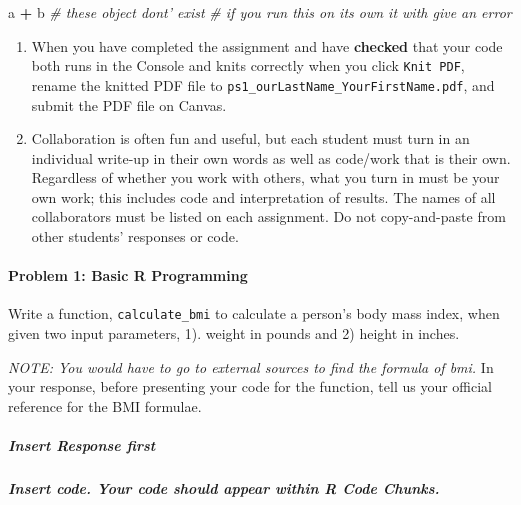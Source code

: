 \documentclass[
]{article}
\newenvironment{Shaded}{\begin{snugshade}}{\end{snugshade}}
\newcommand{\CommentTok}[1]{\textcolor[rgb]{0.56,0.35,0.01}{\textit{#1}}}
\newcommand{\NormalTok}[1]{#1}
\newcommand{\OperatorTok}[1]{\textcolor[rgb]{0.81,0.36,0.00}{\textbf{#1}}}
\newcommand{\StringTok}[1]{\textcolor[rgb]{0.31,0.60,0.02}{#1}}
\begin{document}
\begin{Shaded}
\begin{Highlighting}[]
\NormalTok{a }\OperatorTok{+}\StringTok{ }\NormalTok{b }\CommentTok{# these object dont' exist }
\CommentTok{# if you run this on its own it with give an error}
\end{Highlighting}
\end{Shaded}

\begin{enumerate}
\def\labelenumi{\arabic{enumi}.}
\setcounter{enumi}{6}
\item
  When you have completed the assignment and have \textbf{checked} that
  your code both runs in the Console and knits correctly when you click
  \texttt{Knit\ PDF}, rename the knitted PDF file to
  \texttt{ps1\_ourLastName\_YourFirstName.pdf}, and submit the PDF file
  on Canvas.
\item
  Collaboration is often fun and useful, but each student must turn in
  an individual write-up in their own words as well as code/work that is
  their own. Regardless of whether you work with others, what you turn
  in must be your own work; this includes code and interpretation of
  results. The names of all collaborators must be listed on each
  assignment. Do not copy-and-paste from other students' responses or
  code.
\end{enumerate}

\hypertarget{problem-1-basic-r-programming}{%
\paragraph{Problem 1: Basic R
Programming}\label{problem-1-basic-r-programming}}

Write a function, \texttt{calculate\_bmi} to calculate a person's body
mass index, when given two input parameters, 1). weight in pounds and 2)
height in inches.

\emph{NOTE: You would have to go to external sources to find the formula
of bmi.} In your response, before presenting your code for the function,
tell us your official reference for the BMI formulae.

\hypertarget{insert-response-first}{%
\subparagraph{Insert Response first}\label{insert-response-first}}

\hypertarget{insert-code.-your-code-should-appear-within-r-code-chunks.}{%
\subparagraph{Insert code. Your code should appear within R Code
Chunks.}\label{insert-code.-your-code-should-appear-within-r-code-chunks.}}
\end{document}
